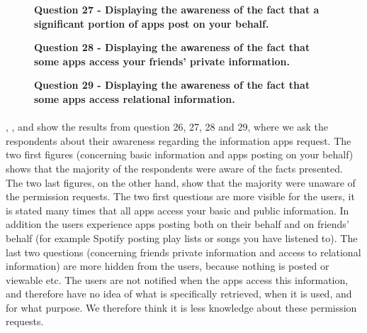 \begin{figure}[h!]
\centering
{}
\caption[Question 27 - Displaying the awareness of the fact that a significant portion of apps post on your behalf]{\textbf{Question 27 - Displaying the awareness of the fact that a significant portion of apps post on your behalf.}} 
\label{fig:appspostonyourbehalf}
\end{figure}

\begin{figure}[h!]
\centering
{}
\caption[Question 28 - Displaying the awareness of the fact that some apps access your friends' private information]{\textbf{Question 28 - Displaying the awareness of the fact that some apps access your friends' private information.}} 
\label{fig:appsaccesstofriendsinfo}
\end{figure}

\begin{figure}[h!]
\centering
{}
\caption[Question 29 - Displaying the awareness of the fact that some apps access relational information]{\textbf{Question 29 - Displaying the awareness of the fact that some apps access relational information.}} 
\label{fig:appsaccessrelationalinfo}
\end{figure}

\paragraph{}
, ,  and  show the results from question 26, 27, 28 and 29, where we ask the respondents about their awareness regarding the information apps request. The two first figures (concerning basic information and apps posting on your behalf) shows that the majority of the respondents were aware of the facts presented. The two last figures, on the other hand, show that the majority were unaware of the permission requests. The two first questions are more visible for the users, it is stated many times that all apps access your basic and public information. In addition the users experience apps posting both on their behalf and on friends' behalf (for example Spotify posting play lists or songs you have listened to). The last two questions (concerning friends private information and access to relational information) are more hidden from the users, because nothing is posted or viewable etc. The users are not notified when the apps access this information, and therefore have no idea of what is specifically retrieved, when it is used, and for what purpose. We therefore think it is less knowledge about these permission requests. 

